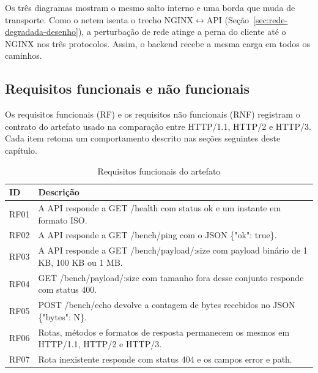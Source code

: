 Os três diagramas mostram o mesmo salto interno e uma borda que muda de transporte. Como o netem isenta o trecho NGINX$\leftrightarrow$API (Seção~\ref{sec:rede-degradada-desenho}), a perturbação de rede atinge a perna do cliente até o NGINX nos três protocolos. Assim, o backend recebe a mesma carga em todos os caminhos.

\subsection{Requisitos funcionais e não funcionais}\label{sec:requisitos}

Os requisitos funcionais (RF) e os requisitos não funcionais (RNF) registram o contrato do artefato usado na comparação entre HTTP/1.1, HTTP/2 e HTTP/3. Cada item retoma um comportamento descrito nas seções seguintes deste capítulo.

\begin{table}[H]
\centering
\caption{Requisitos funcionais do artefato}\label{tab:requisitos-funcionais}
\small
\setlength{\tabcolsep}{3pt}
\begin{tabular}{@{}>{\raggedright\arraybackslash}p{22mm}>{\raggedright\arraybackslash}p{124mm}@{}}
\hline
\textbf{ID} & \textbf{Descrição} \\
\hline
RF01 & A API responde a GET /health com status ok e um instante em formato ISO. \\
RF02 & A API responde a GET /bench/ping com o JSON \{"ok": true\}. \\
RF03 & A API responde a GET /bench/payload/:size com payload binário de 1 KB, 100 KB ou 1 MB. \\
RF04 & GET /bench/payload/:size com tamanho fora desse conjunto responde com status 400. \\
RF05 & POST /bench/echo devolve a contagem de bytes recebidos no JSON \{"bytes": N\}. \\
RF06 & Rotas, métodos e formatos de resposta permanecem os mesmos em HTTP/1.1, HTTP/2 e HTTP/3. \\
RF07 & Rota inexistente responde com status 404 e os campos error e path. \\
\hline
\end{tabular}
\end{table}

